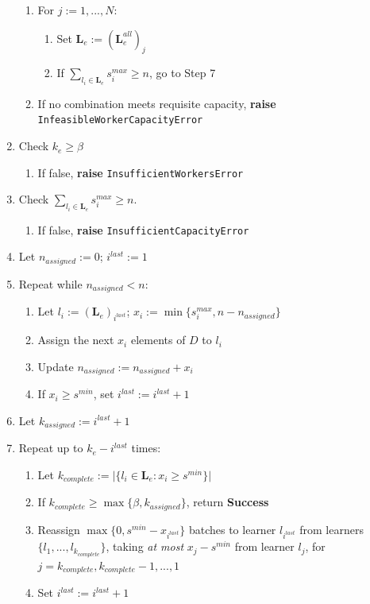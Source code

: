 \documentclass[../mthe-493-final-project.tex]{subfiles}
\begin{document}
\begin{enumerate}
\begin{enumerate}
                \item For $j := 1, ..., N$:
                    \begin{enumerate}
                        \item Set $\mathbf{L}_e := \left( \mathbf{L}_e^{all} \right)_j$
                        \item If $\sum_{l_i \in \mathbf{L}_e} s^{max}_i \geq n$, go to Step 7
                    \end{enumerate}
                \item If no combination meets requisite capacity, \textbf{raise} \texttt{InfeasibleWorkerCapacityError}
            \end{enumerate}
        \item Check $k_e \geq \beta$
            \begin{enumerate}
                \item If false, \textbf{raise} \texttt{InsufficientWorkersError}
            \end{enumerate}
        \item Check $\sum_{l_i \in \mathbf{L}_e} s^{max}_i \geq n$.
            \begin{enumerate}
                \item If false, \textbf{raise} \texttt{InsufficientCapacityError}
            \end{enumerate}
        \item Let $n_{assigned} := 0$; $i^{last} := 1$
        \item Repeat while $n_{assigned} < n$:
            \begin{enumerate}
                \item Let $l_i := \left( \mathbf{L}_e \right)_{i^{last}}$; $x_i := \min\{s^{max}_i, n - n_{assigned}\}$
                \item Assign the next $x_i$ elements of $D$ to $l_i$
                \item Update $n_{assigned} := n_{assigned} + x_i$
                \item If $x_i \geq s^{min}$, set $i^{last} := i^{last} + 1$
            \end{enumerate}
        \item Let $k_{assigned} := i^{last} + 1$
        \item Repeat up to $k_e - i^{last}$ times:
            \begin{enumerate}
                \item Let $k_{complete} := \vert \{l_i \in \mathbf{L}_e : x_i \geq s^{min} \} \vert$
                \item If $k_{complete} \geq \max\{\beta, k_{assigned}\}$, return \textbf{Success}
                \item Reassign $\max\{0, s^{min} - x_{i^{last}}\}$ batches to learner $l_{i^{last}}$ from learners $\{l_1, ..., l_{k_{complete}}\}$, taking \textit{at most} $x_j - s^{min}$ from learner $l_j$, for $j = k_{complete}, k_{complete} - 1, ..., 1$
                \item Set $i^{last} := i^{last} + 1$
            \end{enumerate}
    \end{enumerate}
    
\end{document}
